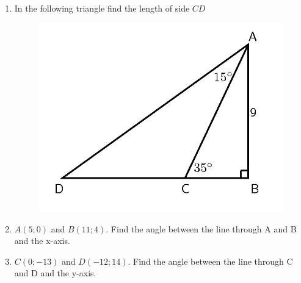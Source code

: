 \begin{enumerate}[noitemsep, label=\textbf{\arabic*}. ]
\begin{figure}[H]
\begin{center}
      \vspace{2pt}
    \vspace{.1in}
    \end{center}
 \end{figure}               \label{m39414*uid106}\item In the following triangle find the length of side \begin{math}CD\end{math}
    \setcounter{subfigure}{0}
	\begin{figure}[H] %
    \begin{center}
    \label{m39414*id92559!!!underscore!!!media}\label{m39414*id92559!!!underscore!!!printimage}\includegraphics{col11306.imgs/m39414_MG10C15_043.png} %
      \vspace{2pt}
    \vspace{.1in}
    \end{center}
 \end{figure}               \label{m39414*uid107}\item \begin{math}A\left(5;0\right)\end{math} and \begin{math}B\left(11;4\right)\end{math}. Find the angle between the line through A and B and the x-axis.\newline
\label{m39414*uid108}\item \begin{math}C\left(0;-13\right)\end{math} and \begin{math}D\left(-12;14\right)\end{math}. Find the angle between the line through C and D and the y-axis.\newline

\end{enumerate}
